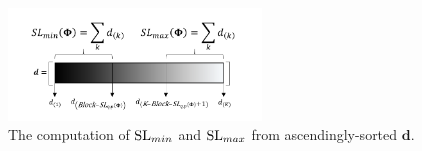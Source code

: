 \begin{figure}[!b]
\centering
\includegraphics[width=0.6\textwidth,keepaspectratio]{images/Sorted-d.png} %
\centering
\caption{The computation of $\mathrm{SL}_{min}$ and $\mathrm{SL}_{max}$ from ascendingly-sorted $\boldsymbol{d}$.}
\label{fig:Sorted-d}
\end{figure}